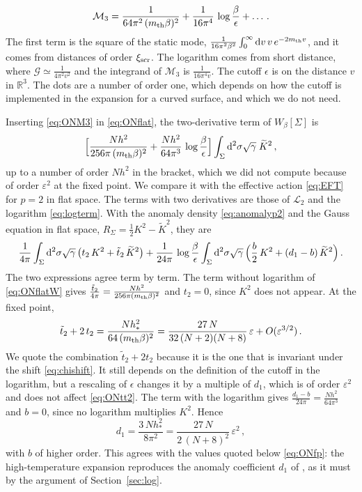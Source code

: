 \documentclass[a4paper,11pt]{article}
\newcommand{\Kt}{\widetilde{K}}
\newcommand{\xiscr}{\xi_{\rm scr}}
\newcommand{\dd}{\mathrm{d}}
\begin{document}
\begin{equation}\label{eq:ONM3}
	\mathcal{M}_3=\frac{1}{64\pi^2\,(m_{\rm th}\beta)^2}+\frac{1}{16\pi^4}\,\log\frac{\beta}{\epsilon}+\dots\, .
\end{equation}
The first term is the square of the static mode, $\tfrac{1}{16\pi^2\beta^2}\int_0^\infty\dd v\,v\,e^{-2m_{\rm th}v}$, and it comes from distances of order $\xiscr$. The logarithm comes from short distance, where $\mathcal{G}\simeq\tfrac{1}{4\pi^2v^2}$ and the integrand of $\mathcal{M}_3$ is $\tfrac{1}{16\pi^4v}$. The cutoff $\epsilon$ is on the distance $v$ in $\mathbb{R}^3$. The dots are a number of order one, which depends on how the cutoff is implemented in the expansion for a curved surface, and which we do not need.

Inserting \eqref{eq:ONM3} in \eqref{eq:ONflat}, the two-derivative term of $W_\beta[\Sigma]$ is
\begin{equation}\label{eq:ONflatW}
	\Bigl[\frac{N h^2}{256\pi\,(m_{\rm th}\beta)^2}+\frac{N h^2}{64\pi^3}\,\log\frac{\beta}{\epsilon}\Bigr]\int_\Sigma\dd^2\sigma\sqrt\gamma\;\Kt^2\, ,
\end{equation}
up to a number of order $N h^2$ in the bracket, which we did not compute because of order $\varepsilon^2$ at the fixed point. We compare it with the effective action \eqref{eq:EFT} for $p=2$ in flat space. The terms with two derivatives are those of $\mathcal{L}_2$ and the logarithm \eqref{eq:logterm}. With the anomaly density \eqref{eq:anomalyp2} and the Gauss equation in flat space, $R_\Sigma=\tfrac12K^2-\Kt^2$, they are
\begin{equation}\label{eq:ONflatEFT}
	\frac{1}{4\pi}\int_\Sigma\dd^2\sigma\sqrt\gamma\,\bigl(t_2\,K^2+\tilde t_2\,\Kt^2\bigr)
	+\frac{1}{24\pi}\,\log\frac\beta\epsilon\int_\Sigma\dd^2\sigma\sqrt\gamma\,\Bigl(\frac b2\,K^2+(d_1-b)\,\Kt^2\Bigr)\, .
\end{equation}
The two expressions agree term by term. The term without logarithm of \eqref{eq:ONflatW} gives $\tfrac{\tilde t_2}{4\pi}=\tfrac{N h^2}{256\pi(m_{\rm th}\beta)^2}$ and $t_2=0$, since $K^2$ does not appear. At the fixed point,
\begin{equation}\label{eq:ONtt2}
	\tilde t_2+2\,t_2=\frac{N h_*^2}{64\,(m_{\rm th}\beta)^2}=\frac{27\,N}{32\,(N+2)(N+8)}\,\varepsilon+O(\varepsilon^{3/2})\, .
\end{equation}
We quote the combination $\tilde t_2+2t_2$ because it is the one that is invariant under the shift \eqref{eq:chishift}. It still depends on the definition of the cutoff in the logarithm, but a rescaling of $\epsilon$ changes it by a multiple of $d_1$, which is of order $\varepsilon^2$ and does not affect \eqref{eq:ONtt2}. The term with the logarithm gives $\tfrac{d_1-b}{24\pi}=\tfrac{N h^2}{64\pi^3}$ and $b=0$, since no logarithm multiplies $K^2$. Hence
\begin{equation}\label{eq:ONd1}
	d_1=\frac{3\,N h_*^2}{8\pi^2}=\frac{27\,N}{2\,(N+8)^2}\,\varepsilon^2\, ,
\end{equation}
with $b$ of higher order. This agrees with the values quoted below \eqref{eq:ONfp}: the high-temperature expansion reproduces the anomaly coefficient $d_1$ of \cite{Diatlyk:2024ngd}, as it must by the argument of Section~\ref{sec:log}.
\end{document}
